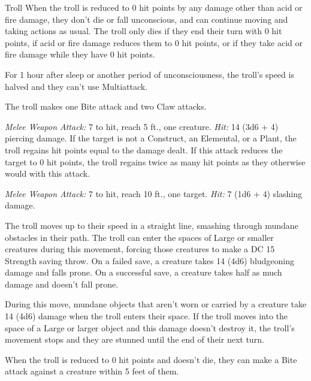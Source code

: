 \documentclass[10pt,a4paper,twoside,bg=print,twocolumn,openany,nodeprecatedcode]{dndbook}
\begin{document}
\begin{DndMonster}[float=t]{Troll}
\DndMonsterBasics[
armor-class = {15 (natural armor)},
hit-points = {\DndDice{9d10 + 45}},
speed = {40 ft.}
]
\DndMonsterAbilityScores[
 str = 18,
 dex = 13,
 con = 20,
 int = 7,
 wis = 9,
 cha = 7
]
\DndMonsterDetails[
saving-throws = {Con +8},
skills = {Athletics +7, Perception +5},
senses = {darkvision 60 ft., passive perception 15},
languages = {Giant},
challenge = 5,
]
When the troll is reduced to 0 hit points by any damage other than acid or fire damage, they don't die or fall unconscious, and can continue moving and taking actions as usual. The troll only dies if they end their turn with 0 hit points, if acid or fire damage reduces them to 0 hit points, or if they take acid or fire damage while they have 0 hit points.

For 1 hour after sleep or another period of unconsciousness, the troll's speed is halved and they can't use Multiattack.

The troll makes one Bite attack and two Claw attacks.

\textsl{Melee Weapon Attack:} 7 to hit, reach 5 ft., one creature. \textsl{Hit:} 14 (3d6 + 4) piercing damage. If the target is not a Construct, an Elemental, or a Plant, the troll regains hit points equal to the damage dealt. If this attack reduces the target to 0 hit points, the troll regains twice as many hit points as they otherwise would with this attack.

\textsl{Melee Weapon Attack:} 7 to hit, reach 10 ft., one target. \textsl{Hit:} 7 (1d6 + 4) slashing damage.

The troll moves up to their speed in a straight line, smashing through mundane obstacles in their path. The troll can enter the spaces of Large or smaller creatures during this movement, forcing those creatures to make a DC 15 Strength saving throw. On a failed save, a creature takes 14 (4d6) bludgeoning damage and falls prone. On a successful save, a creature takes half as much damage and doesn't fall prone.

During this move, mundane objects that aren't worn or carried by a creature take 14 (4d6) damage when the troll enters their space. If the troll moves into the space of a Large or larger object and this damage doesn't destroy it, the troll's movement stops and they are stunned until the end of their next turn.

When the troll is reduced to 0 hit points and doesn't die, they can make a Bite attack against a creature within 5 feet of them.

\end{DndMonster}
\end{document}

